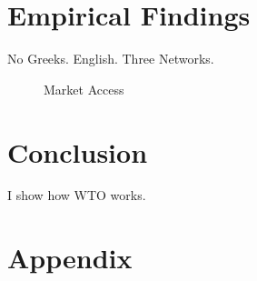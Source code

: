 \documentclass[12pt,letterpaper]{article}
\begin{document}
\section{Empirical Findings}
No Greeks. English. Three Networks.

\begin{figure}
  \centering{
    
  }
  \caption{Market Access}
  \label{fig:market-aceess}
\end{figure}


\section{Conclusion}
I show how WTO works.

\clearpage



\section{Appendix}



\end{document}
